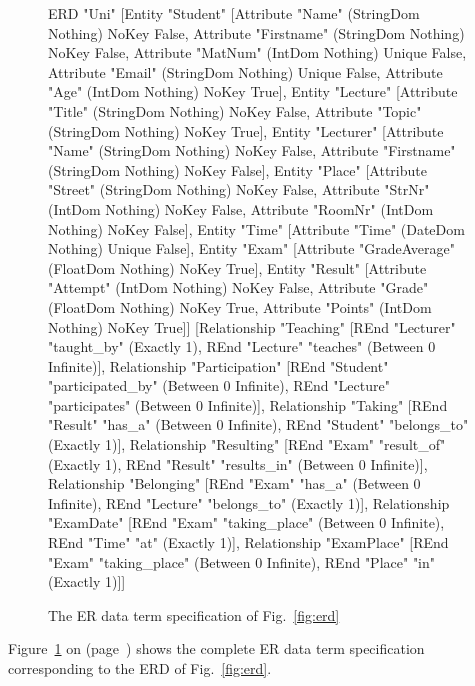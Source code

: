 \begin{figure}[t]
\begin{curry}
 ERD "Uni"
   [Entity "Student"
           [Attribute "Name" (StringDom Nothing) NoKey False,
            Attribute "Firstname" (StringDom Nothing) NoKey False,
            Attribute "MatNum" (IntDom Nothing) Unique False,
            Attribute "Email" (StringDom Nothing) Unique False,
            Attribute "Age" (IntDom Nothing) NoKey True],
    Entity "Lecture"
           [Attribute "Title" (StringDom Nothing) NoKey False,
            Attribute "Topic" (StringDom Nothing) NoKey True],
    Entity "Lecturer"
           [Attribute "Name" (StringDom Nothing) NoKey False,
            Attribute "Firstname" (StringDom Nothing) NoKey False],
    Entity "Place"
           [Attribute "Street" (StringDom Nothing) NoKey False,
            Attribute "StrNr" (IntDom Nothing) NoKey False,
            Attribute "RoomNr" (IntDom Nothing) NoKey False], 
    Entity "Time"
           [Attribute "Time" (DateDom Nothing) Unique False],
    Entity "Exam"
           [Attribute "GradeAverage" (FloatDom Nothing) NoKey True],
    Entity "Result"
           [Attribute "Attempt" (IntDom Nothing) NoKey False,  
            Attribute "Grade" (FloatDom Nothing) NoKey True,
            Attribute "Points" (IntDom Nothing) NoKey True]]
   [Relationship "Teaching"
                 [REnd "Lecturer" "taught_by" (Exactly 1),
                  REnd "Lecture" "teaches" (Between 0 Infinite)],
    Relationship "Participation"
                 [REnd "Student" "participated_by" (Between 0 Infinite),
                  REnd "Lecture" "participates" (Between 0 Infinite)],
    Relationship "Taking"
                 [REnd "Result" "has_a" (Between 0 Infinite),
                  REnd "Student" "belongs_to" (Exactly 1)],
    Relationship "Resulting"
                 [REnd "Exam" "result_of" (Exactly 1),
                  REnd "Result" "results_in" (Between 0 Infinite)],
    Relationship "Belonging"
                 [REnd "Exam" "has_a" (Between 0 Infinite),
                  REnd "Lecture" "belongs_to" (Exactly 1)],
    Relationship "ExamDate"
                 [REnd "Exam" "taking_place" (Between 0 Infinite),
                  REnd "Time" "at" (Exactly 1)],
    Relationship "ExamPlace"
                 [REnd "Exam" "taking_place" (Between 0 Infinite),
                  REnd "Place" "in" (Exactly 1)]]
\end{curry}
\caption{The ER data term specification of Fig.~\ref{fig:erd}\label{fig:erdterm}}
\end{figure}
Figure~\ref{fig:erdterm} on (page~\pageref{fig:erdterm})
shows the complete ER data term specification
corresponding to the ERD of Fig.~\ref{fig:erd}.

